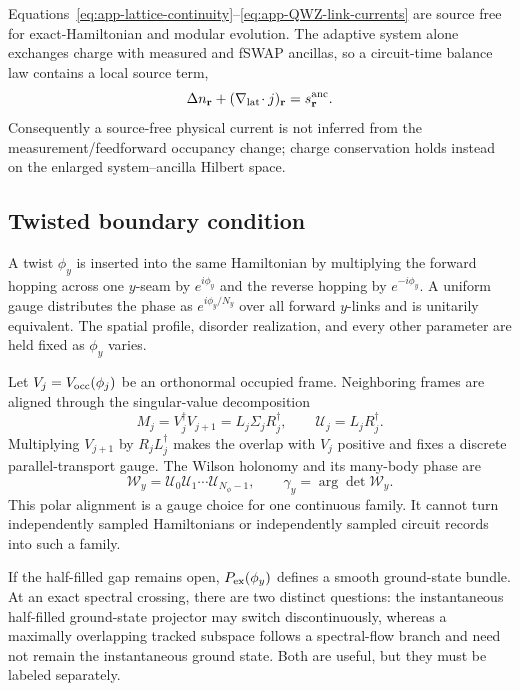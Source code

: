 Equations~\eqref{eq:app-lattice-continuity}--\eqref{eq:app-QWZ-link-currents}
are source free for exact-Hamiltonian and modular evolution.  The adaptive
system alone exchanges charge with measured and fSWAP ancillas, so a
circuit-time balance law contains a local source term,
\begin{equation}
    \Delta n_{\mathbf r}
    +(\nabla_{\rm lat}\!\cdot j)_{\mathbf r}
    =s_{\mathbf r}^{\rm anc}.
    \label{eq:app-adaptive-current-source}
\end{equation}
Consequently a source-free physical current is not inferred from the
measurement/feedforward occupancy change; charge conservation holds instead
on the enlarged system--ancilla Hilbert space.

\subsection{Twisted boundary condition}

A twist \(\phi_y\) is inserted into the same Hamiltonian by multiplying the
forward hopping across one \(y\)-seam by \(e^{i\phi_y}\) and the reverse
hopping by \(e^{-i\phi_y}\).  A uniform gauge distributes the phase as
\(e^{i\phi_y/N_y}\) over all forward \(y\)-links and is unitarily
equivalent.  The spatial profile, disorder realization, and every other
parameter are held fixed as \(\phi_y\) varies.

Let \(V_j=V_{\rm occ}(\phi_j)\) be an orthonormal occupied frame.  Neighboring
frames are aligned through the singular-value decomposition
\begin{equation}
    M_j=V_j^\dagger V_{j+1}=L_j\Sigma_jR_j^\dagger,
    \qquad
    \mathcal U_j=L_jR_j^\dagger .
    \label{eq:app-overlap-polar-link}
\end{equation}
Multiplying \(V_{j+1}\) by \(R_jL_j^\dagger\) makes the overlap with \(V_j\)
positive and fixes a discrete parallel-transport gauge.  The Wilson
holonomy and its many-body phase are
\begin{equation}
    \mathcal W_y=\mathcal U_0\mathcal U_1\cdots\mathcal U_{N_\phi-1},
    \qquad
    \gamma_y=\arg\det\mathcal W_y.
    \label{eq:app-exact-Wilson-holonomy}
\end{equation}
This polar alignment is a gauge choice for one continuous family.  It cannot
turn independently sampled Hamiltonians or independently sampled circuit
records into such a family.

If the half-filled gap remains open, \(P_{\rm ex}(\phi_y)\) defines a smooth
ground-state bundle.  At an exact spectral crossing, there are two distinct
questions: the instantaneous half-filled ground-state projector may switch
discontinuously, whereas a maximally overlapping tracked subspace follows a
spectral-flow branch and need not remain the instantaneous ground state.
Both are useful, but they must be labeled separately.

